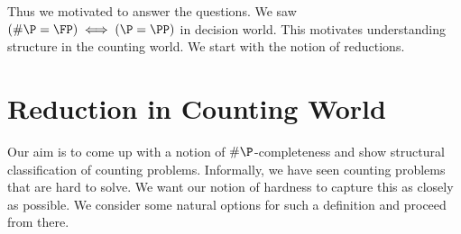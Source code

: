 
Thus we motivated to answer the questions. We saw $(\#\P=\FP) \iff (\P=\PP)$ in decision world. 
This motivates understanding structure in the counting world.
We start with the notion of reductions. 

\section{Reduction in Counting World}

Our aim is to come up with a notion of $\#\P$-completeness and show structural classification of counting problems. Informally, we have seen counting problems that are hard to solve. We want our notion of hardness to capture this as closely as possible. We consider some natural options for such a definition and proceed from there.

